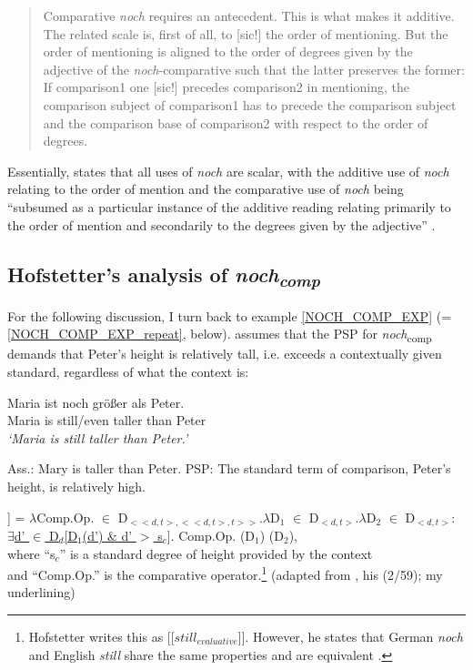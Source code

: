 \documentclass[output=paper,
modfonts
]{langscibook}
\begin{document}
    \begin{quote}
    Comparative \textit{noch} requires an antecedent. This is what makes it additive. The related scale is, first of all, to [sic!] the order of mentioning. But the order of mentioning is aligned to the order of degrees given by the adjective of the \textit{noch}-comparative such that the latter preserves the former: If comparison1 one [sic!] precedes comparison2 in mentioning, the comparison subject of comparison1 has to precede the comparison subject and the comparison base of comparison2 with respect to the order of degrees. \citep[p.13]{umbach2009a_comp}
    \end{quote}


\noindent Essentially, \citeauthor{umbach2009a_comp} states that all uses of \textit{noch} are scalar, with the additive use of \textit{noch} relating to the order of mention and the comparative use of \textit{noch} being ``subsumed as a particular instance of the additive reading relating primarily to the order of mention and secondarily to the degrees given by the adjective'' \citep[p.14]{umbach2009a_comp}.

\subsection{Hofstetter's \citeyearpar{Hofstetter2013} analysis of \textit{noch\textsubscript{comp}}}

For the following discussion, I turn back to example \ref{NOCH_COMP_EXP} (= \ref{NOCH_COMP_EXP_repeat}, below). \citet{Hofstetter2013} assumes that the PSP for \textit{noch}\textsubscript{comp} demands that Peter's height is relatively tall, i.e. exceeds a contextually given standard, regardless of what the context is:

\ea\gll Maria ist noch größer als Peter.\\
Maria is still/even taller than Peter\\
\glt \textit{`Maria is still taller than Peter.'} \label{NOCH_COMP_EXP_repeat}\\
\z

\ea \label{NOCH_COMP_meaning_components} \ea Ass.: Mary is taller than Peter.
\ex PSP: The standard term of comparison, Peter's height, is relatively high.\label{NOCH_COMP_PSP_00} \\
\z\z

\ea\relax [[noch\textsubscript{comp}]] = $\lambda$Comp.Op. $\in$ D$_{<<d,t>,<<d,t>,t>>}$.$\lambda$D$_1$ $\in$ D$_{<d,t>}$.$\lambda$D$_2$ $\in$ D$_{<d,t>}$: \\\underline{$\exists$d' $\in$ D$_d$[D$_1$(d') \& d' $>$ s$_c$}]. Comp.Op. (D$_1$) (D$_2$),\\ where ``s$_c$'' is a standard degree of height provided by the context \\and ``Comp.Op.'' is the comparative operator.\footnote{ Hofstetter writes this as [[$still_{evaluative}$]]. However, he states that German \textit{noch} and English \textit{still} share the same properties and are equivalent \citep[31]{Hofstetter2013}.} \label{HS_entry_comp} 
\flushright\vspace{-9pt} (adapted from \citeauthor{Hofstetter2013} \citeyearpar{Hofstetter2013}, his (2/59); my underlining)\z
\end{document}
